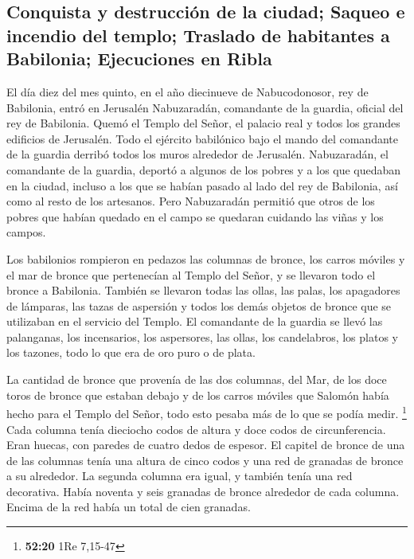 \hypertarget{conquista-y-destrucciuxf3n-de-la-ciudad-saqueo-e-incendio-del-templo-traslado-de-habitantes-a-babilonia-ejecuciones-en-ribla}{%
\subsection{Conquista y destrucción de la ciudad; Saqueo e incendio del
templo; Traslado de habitantes a Babilonia; Ejecuciones en
Ribla}\label{conquista-y-destrucciuxf3n-de-la-ciudad-saqueo-e-incendio-del-templo-traslado-de-habitantes-a-babilonia-ejecuciones-en-ribla}}

 El día diez del mes quinto, en el año diecinueve de
Nabucodonosor, rey de Babilonia, entró en Jerusalén Nabuzaradán,
comandante de la guardia, oficial del rey de Babilonia. 
Quemó el Templo del Señor, el palacio real y todos los grandes edificios
de Jerusalén.  Todo el ejército babilónico bajo el mando
del comandante de la guardia derribó todos los muros alrededor de
Jerusalén.  Nabuzaradán, el comandante de la guardia,
deportó a algunos de los pobres y a los que quedaban en la ciudad,
incluso a los que se habían pasado al lado del rey de Babilonia, así
como al resto de los artesanos.  Pero Nabuzaradán
permitió que otros de los pobres que habían quedado en el campo se
quedaran cuidando las viñas y los campos.

 Los babilonios rompieron en pedazos las columnas de
bronce, los carros móviles y el mar de bronce que pertenecían al Templo
del Señor, y se llevaron todo el bronce a Babilonia. 
También se llevaron todas las ollas, las palas, los apagadores de
lámparas, las tazas de aspersión y todos los demás objetos de bronce que
se utilizaban en el servicio del Templo.  El comandante
de la guardia se llevó las palanganas, los incensarios, los aspersores,
las ollas, los candelabros, los platos y los tazones, todo lo que era de
oro puro o de plata.

 La cantidad de bronce que provenía de las dos columnas,
del Mar, de los doce toros de bronce que estaban debajo y de los carros
móviles que Salomón había hecho para el Templo del Señor, todo esto
pesaba más de lo que se podía medir. \footnote{\textbf{52:20} 1Re
  7,15-47}  Cada columna tenía dieciocho codos de altura
y doce codos de circunferencia. Eran huecas, con paredes de cuatro dedos
de espesor.  El capitel de bronce de una de las columnas
tenía una altura de cinco codos y una red de granadas de bronce a su
alrededor. La segunda columna era igual, y también tenía una red
decorativa.  Había noventa y seis granadas de bronce
alrededor de cada columna. Encima de la red había un total de cien
granadas.

